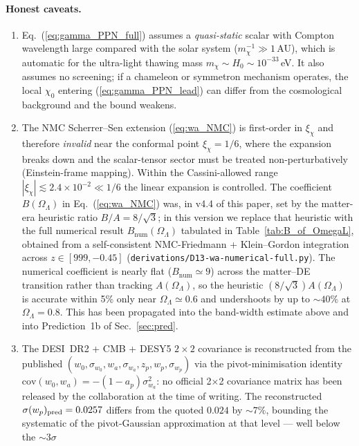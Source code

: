 \paragraph{Honest caveats.}
\begin{enumerate}
\item Eq.~(\ref{eq:gamma_PPN_full}) assumes a \emph{quasi-static} scalar with Compton wavelength
  large compared with the solar system ($m_\chi^{-1}\gg 1\,$AU), which is automatic for the
  ultra-light thawing mass $m_\chi\sim H_0\sim 10^{-33}$\,eV. It also assumes no screening; if
  a chameleon or symmetron mechanism operates, the local $\chi_0$ entering
  (\ref{eq:gamma_PPN_lead}) can differ from the cosmological background and the bound weakens.
\item The NMC Scherrer--Sen extension (\ref{eq:wa_NMC}) is first-order in $\xi_\chi$ and
  therefore \emph{invalid} near the conformal point $\xi_\chi=1/6$, where the expansion breaks
  down and the scalar-tensor sector must be treated non-perturbatively (Einstein-frame
  mapping). Within the Cassini-allowed range $|\xi_\chi|\lesssim 2.4\times 10^{-2}\ll 1/6$
  the linear expansion is controlled. The coefficient $B(\Omega_\Lambda)$ in
  Eq.~(\ref{eq:wa_NMC}) was, in v4.4 of this paper, set by the matter-era
  heuristic ratio $B/A=8/\sqrt3$; in this version we replace that heuristic with
  the full numerical result $B_{\mathrm{num}}(\Omega_\Lambda)$ tabulated in
  Table~\ref{tab:B_of_OmegaL}, obtained from a self-consistent
  NMC-Friedmann + Klein--Gordon integration across $z\in[999,-0.45]$
  (\texttt{derivations/D13-wa-numerical-full.py}). The numerical coefficient is
  nearly flat ($B_{\mathrm{num}}\simeq 9$) across the matter--DE transition
  rather than tracking $A(\Omega_\Lambda)$, so the heuristic
  $(8/\sqrt3)A(\Omega_\Lambda)$ is accurate within 5\% only near
  $\Omega_\Lambda\simeq 0.6$ and undershoots by up to $\sim\!40\%$ at
  $\Omega_\Lambda=0.8$. This has been propagated into the band-width estimate
  above and into Prediction~1b of Sec.~\ref{sec:pred}.
\item The DESI~DR2 + CMB + DESY5 $2\times 2$ covariance is reconstructed from the published
  $(w_0,\sigma_{w_0},w_a,\sigma_{w_a},z_p,w_p,\sigma_{w_p})$ via the pivot-minimisation
  identity $\mathrm{cov}(w_0,w_a)=-(1-a_p)\sigma_{w_a}^2$: no official 2$\times$2 covariance
  matrix has been released by the collaboration at the time of writing. The reconstructed
  $\sigma(w_p)_{\rm pred}=0.0257$ differs from the quoted $0.024$ by $\sim 7\%$, bounding the
  systematic of the pivot-Gaussian approximation at that level --- well below the $\sim 3\sigma$

\end{enumerate}
